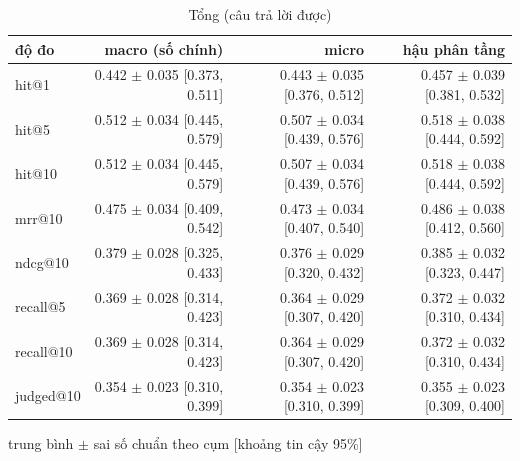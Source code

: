 
\begin{table}[ht]
\centering
\caption{Tổng (câu trả lời được)}
\begin{tabular}{lrrr}
\toprule
độ đo & macro (số chính) & micro & hậu phân tầng \\
\midrule
hit@1 & 0.442 $\pm$ 0.035 [0.373, 0.511] & 0.443 $\pm$ 0.035 [0.376, 0.512] & 0.457 $\pm$ 0.039 [0.381, 0.532] \\
hit@5 & 0.512 $\pm$ 0.034 [0.445, 0.579] & 0.507 $\pm$ 0.034 [0.439, 0.576] & 0.518 $\pm$ 0.038 [0.444, 0.592] \\
hit@10 & 0.512 $\pm$ 0.034 [0.445, 0.579] & 0.507 $\pm$ 0.034 [0.439, 0.576] & 0.518 $\pm$ 0.038 [0.444, 0.592] \\
mrr@10 & 0.475 $\pm$ 0.034 [0.409, 0.542] & 0.473 $\pm$ 0.034 [0.407, 0.540] & 0.486 $\pm$ 0.038 [0.412, 0.560] \\
ndcg@10 & 0.379 $\pm$ 0.028 [0.325, 0.433] & 0.376 $\pm$ 0.029 [0.320, 0.432] & 0.385 $\pm$ 0.032 [0.323, 0.447] \\
recall@5 & 0.369 $\pm$ 0.028 [0.314, 0.423] & 0.364 $\pm$ 0.029 [0.307, 0.420] & 0.372 $\pm$ 0.032 [0.310, 0.434] \\
recall@10 & 0.369 $\pm$ 0.028 [0.314, 0.423] & 0.364 $\pm$ 0.029 [0.307, 0.420] & 0.372 $\pm$ 0.032 [0.310, 0.434] \\
judged@10 & 0.354 $\pm$ 0.023 [0.310, 0.399] & 0.354 $\pm$ 0.023 [0.310, 0.399] & 0.355 $\pm$ 0.023 [0.309, 0.400] \\
\bottomrule
\end{tabular}
\par\smallskip\footnotesize trung bình $\pm$ sai số chuẩn theo cụm [khoảng tin cậy 95\%]
\end{table}

